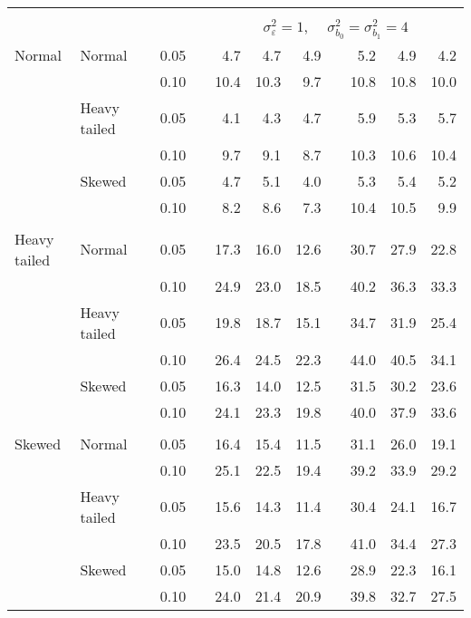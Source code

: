 \begin{table}[ht]
\begin{scriptsize}
\begin{center}
\begin{tabular}{ll p{.1cm} c p{.1cm} rrr p{.1cm} rrr}
&&&&&&&&&&&\\
& && && \multicolumn{7}{c}{$\sigma_{\varepsilon}^2 = 1$, \ \ $\sigma_{b_0}^2 = \sigma_{b_1}^2 = 4$} \\ \cline{6-12}
\rowcolor{gray!20}Normal       & Normal       && 0.05 &&   4.7 & 4.7 & 4.9 &   & 5.2 & 4.9 & 4.2 \\ 
\rowcolor{gray!20}             &              && 0.10 &&   10.4 & 10.3 & 9.7 &   & 10.8 & 10.8 & 10.0 \\ 
\rowcolor{gray!20}             & Heavy tailed && 0.05 &&   4.1 & 4.3 & 4.7 &   & 5.9 & 5.3 & 5.7 \\ 
\rowcolor{gray!20}             &              && 0.10 &&   9.7 & 9.1 & 8.7 &   & 10.3 & 10.6 & 10.4 \\ 
\rowcolor{gray!20}             & Skewed       && 0.05 &&   4.7 & 5.1 & 4.0 &   & 5.3 & 5.4 & 5.2 \\ 
\rowcolor{gray!20}             &              && 0.10 &&   8.2 & 8.6 & 7.3 &   & 10.4 & 10.5 & 9.9 \\ 
&&&&&&&&&&&\\
Heavy tailed & Normal       && 0.05 &&   17.3 & 16.0 & 12.6 &   & 30.7 & 27.9 & 22.8 \\ 
             &              && 0.10 &&   24.9 & 23.0 & 18.5 &   & 40.2 & 36.3 & 33.3 \\ 
             & Heavy tailed && 0.05 &&   19.8 & 18.7 & 15.1 &   & 34.7 & 31.9 & 25.4 \\ 
             &              && 0.10 &&   26.4 & 24.5 & 22.3 &   & 44.0 & 40.5 & 34.1 \\ 
             & Skewed       && 0.05 &&   16.3 & 14.0 & 12.5 &   & 31.5 & 30.2 & 23.6 \\ 
             &              && 0.10 &&   24.1 & 23.3 & 19.8 &   & 40.0 & 37.9 & 33.6 \\ 
&&&&&&&&&&&\\
Skewed       & Normal       && 0.05 &&   16.4 & 15.4 & 11.5 &   & 31.1 & 26.0 & 19.1 \\ 
             &              && 0.10 &&   25.1 & 22.5 & 19.4 &   & 39.2 & 33.9 & 29.2 \\ 
             & Heavy tailed && 0.05 &&   15.6 & 14.3 & 11.4 &   & 30.4 & 24.1 & 16.7 \\ 
             &              && 0.10 &&   23.5 & 20.5 & 17.8 &   & 41.0 & 34.4 & 27.3 \\ 
             & Skewed       && 0.05 &&   15.0 & 14.8 & 12.6 &   & 28.9 & 22.3 & 16.1 \\ 
             &              && 0.10 &&   24.0 & 21.4 & 20.9 &   & 39.8 & 32.7 & 27.5 \\ 

\hline
\end{tabular}
\end{center}
\end{scriptsize}
\end{table}